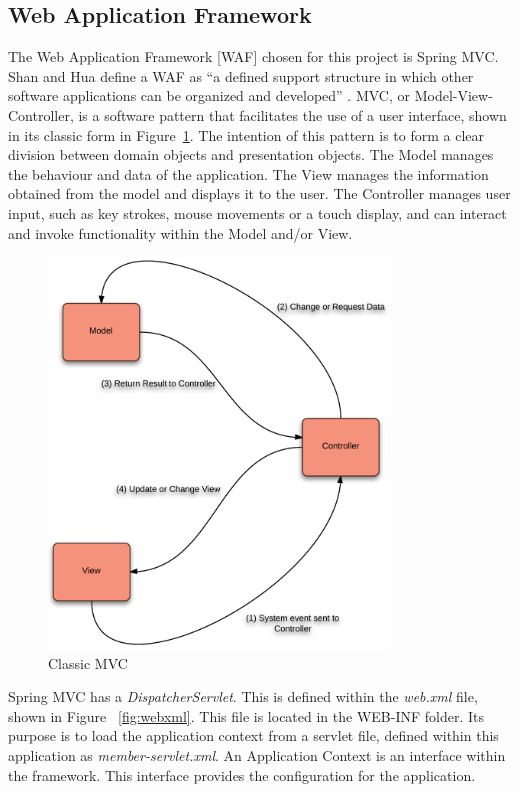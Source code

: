 \subsection{Web Application Framework}
The Web Application Framework [WAF] chosen for this project is Spring MVC. Shan and Hua define a WAF as “a defined support structure in which other software applications can be organized and developed” \parencite{shan2006taxonomy}. MVC, or Model-View-Controller, is a software pattern that facilitates the use of a user interface, shown in its classic form in Figure~\ref{fig:mvcclassic}. The intention of this pattern is to form a clear division between domain objects and presentation objects. The Model manages the behaviour and data of the application. The View manages the information obtained from the model and displays it to the user. The Controller manages user input, such as key strokes, mouse movements or a touch display, and can interact and invoke functionality within the Model and/or View.

\begin{figure}[H]
\begin{center}
\includegraphics[width=9cm]{mvcclassic.png}
\end{center}
\caption{Classic MVC}
\label{fig:mvcclassic}
\end{figure}

Spring MVC has a \textit{DispatcherServlet}. This is defined within the \textit{web.xml} file, shown in Figure ~\ref{fig:webxml}. This file is located in the WEB-INF folder. Its purpose is to load the application context from a servlet file, defined within this application as \textit{member-servlet.xml}. An Application Context is an interface within the framework. This interface provides the configuration for the application. 

